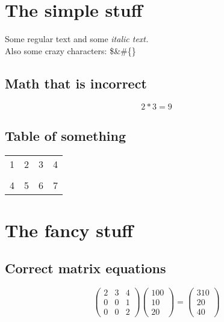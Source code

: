 \documentclass{article}
\begin{document}
\section{The simple stuff}
Some regular text and some
\textit{italic text. }
\\Also some crazy characters: \$\&\#\{\}
\subsection{Math that is incorrect}
$$
2*3 = 9
$$


\subsection{Table of something}
\begin{tabular}{rc|cl}
\hline
1&2&3&4\\
\cline{1-2}
&&&\\
4&5&6&7\\
\end{tabular}


\section{The fancy stuff}
\subsection{Correct matrix equations}
$$
\begin{pmatrix}
2&3&4\\
0&0&1\\
0&0&2
\end{pmatrix} \begin{pmatrix}
100\\
10\\
20
\end{pmatrix} = \begin{pmatrix}
310\\
20\\
40
\end{pmatrix}
$$
\end{document}

